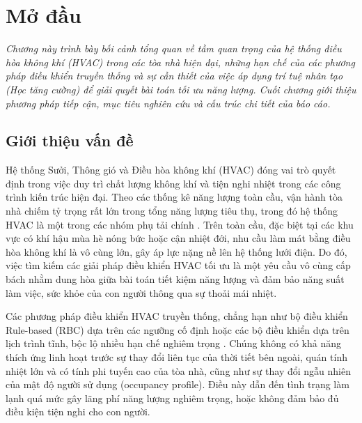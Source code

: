 \documentclass[12pt, a4paper]{report}
\begin{document}

\newpage


\newpage



\newpage
\tableofcontents
\newpage
\listoffigures
\newpage
\listoftables
\newpage


\chapter{Mở đầu}

\textit{Chương này trình bày bối cảnh tổng quan về tầm quan trọng của hệ thống điều hòa không khí (HVAC) trong các tòa nhà hiện đại, những hạn chế của các phương pháp điều khiển truyền thống và sự cần thiết của việc áp dụng trí tuệ nhân tạo (Học tăng cường) để giải quyết bài toán tối ưu năng lượng. Cuối chương giới thiệu phương pháp tiếp cận, mục tiêu nghiên cứu và cấu trúc chi tiết của báo cáo.}

\section{Giới thiệu vấn đề}
Hệ thống Sưởi, Thông gió và Điều hòa không khí (HVAC) đóng vai trò quyết định trong việc duy trì chất lượng không khí và tiện nghi nhiệt trong các công trình kiến trúc hiện đại. Theo các thống kê năng lượng toàn cầu, vận hành tòa nhà chiếm tỷ trọng rất lớn trong tổng năng lượng tiêu thụ, trong đó hệ thống HVAC là một trong các nhóm phụ tải chính \cite{iea_buildings}. Trên toàn cầu, đặc biệt tại các khu vực có khí hậu mùa hè nóng bức hoặc cận nhiệt đới, nhu cầu làm mát bằng điều hòa không khí là vô cùng lớn, gây áp lực nặng nề lên hệ thống lưới điện. Do đó, việc tìm kiếm các giải pháp điều khiển HVAC tối ưu là một yêu cầu vô cùng cấp bách nhằm dung hòa giữa bài toán tiết kiệm năng lượng và đảm bảo năng suất làm việc, sức khỏe của con người thông qua sự thoải mái nhiệt.

Các phương pháp điều khiển HVAC truyền thống, chẳng hạn như bộ điều khiển Rule-based (RBC) dựa trên các ngưỡng cố định hoặc các bộ điều khiển dựa trên lịch trình tĩnh, bộc lộ nhiều hạn chế nghiêm trọng \cite{whulx}. Chúng không có khả năng thích ứng linh hoạt trước sự thay đổi liên tục của thời tiết bên ngoài, quán tính nhiệt lớn và có tính phi tuyến cao của tòa nhà, cũng như sự thay đổi ngẫu nhiên của mật độ người sử dụng (occupancy profile). Điều này dẫn đến tình trạng làm lạnh quá mức gây lãng phí năng lượng nghiêm trọng, hoặc không đảm bảo đủ điều kiện tiện nghi cho con người.
\end{document}
